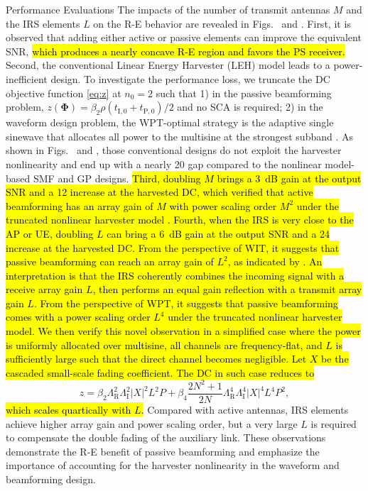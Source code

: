 \documentclass[journal,12pt,onecolumn,draftclsnofoot]{IEEEtran}
\begin{document}
\begin{section}{Performance Evaluations}
		The impacts of the number of transmit antennas $M$ and the IRS elements $L$ on the R-E behavior are revealed in Figs.~ and . First, it is observed that adding either active or passive elements can improve the equivalent SNR, \hl{which produces a nearly concave R-E region and favors the PS receiver.} Second, the conventional Linear Energy Harvester (LEH) model leads to a power-inefficient design. To investigate the performance loss, we truncate the DC objective function \eqref{eq:z} at $n_0=2$ such that 1) in the passive beamforming problem, $z(\boldsymbol{\Phi}) = {\beta_2}{\rho}(t_{\mathrm{I},0}+t_{\mathrm{P},0})/2$ and no SCA is required; 2) in the waveform design problem, the WPT-optimal strategy is the adaptive single sinewave that allocates all power to the multisine at the strongest subband \cite{Clerckx2016a}. As shown in Figs.~ and , those conventional designs do not exploit the harvester nonlinearity and end up with a nearly \SI{20}{\dBA} gap compared to the nonlinear model-based SMF and GP designs. \hl{Third, doubling $M$ brings a \mbox{\SI{3}{\dB}} gain at the output SNR and a \mbox{\SI{12}{\dBA}} increase at the harvested DC, which verified that active beamforming has an array gain of $M$ \cite{Tse2005} with power scaling order $M^2$ under the truncated nonlinear harvester model \cite{Clerckx2016a,Clerckx2018b}. Fourth, when the IRS is very close to the AP or UE, doubling $L$ can bring a \mbox{\SI{6}{\dB}} gain at the output SNR and a \mbox{\SI{24}{\dBA}} increase at the harvested DC. From the perspective of WIT, it suggests that passive beamforming can reach an array gain of $L^2$, as indicated by \cite{Wu2019}. An interpretation is that the IRS coherently combines the incoming signal with a receive array gain $L$, then performs an equal gain reflection with a transmit array gain $L$. From the perspective of WPT, it suggests that passive beamforming comes with a power scaling order $L^4$ under the truncated nonlinear harvester model. We then verify this novel observation in a simplified case where the power is uniformly allocated over multisine, all channels are frequency-flat, and $L$ is sufficiently large such that the direct channel becomes negligible. Let $X$ be the cascaded small-scale fading coefficient. The DC in such case reduces to}
		\begin{equation}
			z = \beta_2 \Lambda_{\mathrm{R}}^2 \Lambda_{\mathrm{I}}^2 \lvert X \rvert^2 L^2 P + \beta_4 \frac{2N^2 + 1}{2N} \Lambda_{\mathrm{R}}^4 \Lambda_{\mathrm{I}}^4 \lvert X \rvert^4 L^4 P^2,
		\end{equation}
		\hl{which scales quartically with $L$.} Compared with active antennas, IRS elements achieve higher array gain and power scaling order, but a very large $L$ is required to compensate the double fading of the auxiliary link. These observations demonstrate the R-E benefit of passive beamforming and emphasize the importance of accounting for the harvester nonlinearity in the waveform and beamforming design.


\end{section}
\end{document}
